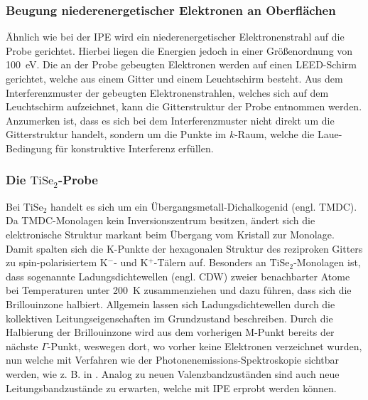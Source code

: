 \subsubsection{Beugung niederenergetischer Elektronen an Oberflächen}

Ähnlich wie bei der IPE wird ein niederenergetischer Elektronenstrahl auf die Probe gerichtet.
Hierbei liegen die Energien jedoch in einer Größenordnung von \SI{100}{\electronvolt}\cite{wiki_leed}.
Die an der Probe gebeugten Elektronen werden auf einen LEED-Schirm gerichtet, welche aus einem Gitter und einem Leuchtschirm besteht.
Aus dem Interferenzmuster der gebeugten Elektronenstrahlen, welches sich auf dem Leuchtschirm aufzeichnet, kann die Gitterstruktur der Probe entnommen werden.
Anzumerken ist, dass es sich bei dem Interferenzmuster nicht direkt um die Gitterstruktur handelt, sondern um die Punkte im $k$-Raum, welche die Laue-Bedingung für konstruktive Interferenz erfüllen.

\subsubsection{\texorpdfstring{Die $\text{TiSe}_2$-Probe}{Die TiSe2-Probe}}

Bei $\text{TiSe}_2$ handelt es sich um ein Übergangsmetall-Dichalkogenid (engl. TMDC).
Da TMDC-Monolagen kein Inversionszentrum besitzen, ändert sich die elektronische Struktur markant beim Übergang vom Kristall zur Monolage.
Damit spalten sich die K-Punkte der hexagonalen Struktur des reziproken Gitters zu spin-polarisiertem K$^{-}$- und K$^{+}$-Tälern auf. %
Besonders an $\text{TiSe}_2$-Monolagen ist, dass sogenannte Ladungsdichtewellen (engl. CDW) zweier benachbarter Atome bei Temperaturen unter \SI{200}{\kelvin} zusammenziehen und dazu führen, dass sich die Brillouinzone halbiert.
Allgemein lassen sich Ladungsdichtewellen durch die kollektiven Leitungseigenschaften im Grundzustand beschreiben.%
Durch die Halbierung der Brillouinzone wird aus dem vorherigen M-Punkt bereits der nächste $\Gamma$-Punkt, weswegen dort, wo vorher keine Elektronen verzeichnet wurden, nun welche mit Verfahren wie der Photonenemissions-Spektroskopie sichtbar werden, wie z. B. in \cite{tise_pe}.
Analog zu neuen Valenzbandzuständen sind auch neue Leitungsbandzustände zu erwarten, welche mit IPE erprobt werden können. %


